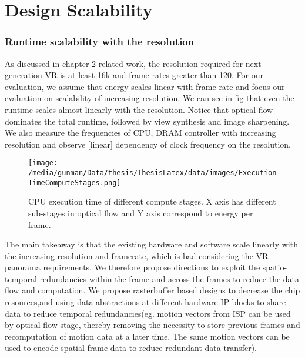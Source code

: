
\section{Design Scalability}	

\subsubsection{Runtime scalability with the resolution}
As discussed in chapter 2 related work, the resolution required for next generation VR is at-least 16k and frame-rates greater than 120. For our evaluation, we assume that energy scales linear with frame-rate and focus our evaluation on scalability of increasing resolution. We can see in fig that even the runtime scales almost linearly with the resolution. Notice that optical flow dominates the total runtime, followed by view synthesis and image sharpening. We also measure the frequencies of CPU, DRAM controller with increasing resolution and observe [linear] dependency of clock frequency on the resolution.
\begin{figure}[h]
	\begin{center}
		\texttt{[image: /media/gunman/Data/thesis/ThesisLatex/data/images/ExecutionTimeComputeStages.png]}
		\caption{CPU execution time of different compute stages. X axis has different sub-stages in optical flow and Y axis correspond to energy per frame.}
		\label{fig:ex_4_9}
	\end{center}
	\vspace{-0.3in}
\end{figure} 

The main takeaway is that the existing hardware and software scale linearly with the increasing resolution and framerate, which is bad considering the VR panorama requirements. We therefore propose directions to exploit the spatio-temporal redundancies within the frame and across the frames to reduce the data flow and computation. We propose rasterbuffer based designs to decrease the chip resources,and using data abstractions at different hardware IP blocks to share data to reduce temporal redundancies(eg. motion vectors from ISP can be used by optical flow stage, thereby removing the necessity to store previous frames and recomputation of motion data at a later time. The same motion vectors can be used to encode spatial frame data to reduce redundant data transfer).


